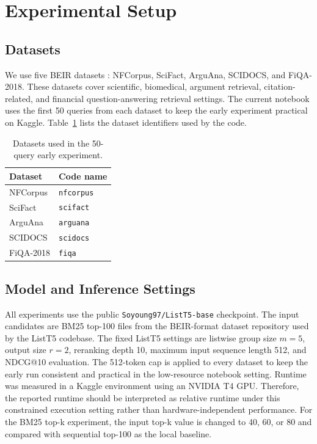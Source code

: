 \section{Experimental Setup}
\label{sec:experimental-setup}

\subsection{Datasets}

We use five BEIR datasets \citep{thakur2021beir}: NFCorpus, SciFact, ArguAna, SCIDOCS, and FiQA-2018.
These datasets cover scientific, biomedical, argument retrieval, citation-related, and financial question-answering retrieval settings.
The current notebook uses the first 50 queries from each dataset to keep the early experiment practical on Kaggle.
Table~\ref{tab:datasets} lists the dataset identifiers used by the code.

\begin{table}[t]
  \centering
  \begin{tabular}{ll}
    \toprule
    Dataset & Code name \\
    \midrule
    NFCorpus & \texttt{nfcorpus} \\
    SciFact & \texttt{scifact} \\
    ArguAna & \texttt{arguana} \\
    SCIDOCS & \texttt{scidocs} \\
    FiQA-2018 & \texttt{fiqa} \\
    \bottomrule
  \end{tabular}
  \caption{Datasets used in the 50-query early experiment.}
  \label{tab:datasets}
\end{table}

\subsection{Model and Inference Settings}

All experiments use the public \texttt{Soyoung97/ListT5-base} checkpoint.
The input candidates are BM25 top-100 files from the BEIR-format dataset repository used by the ListT5 codebase.
The fixed ListT5 settings are listwise group size $m=5$, output size $r=2$, reranking depth 10, maximum input sequence length 512, and NDCG@10 evaluation.
The 512-token cap is applied to every dataset to keep the early run consistent and practical in the low-resource notebook setting. Runtime was measured in a Kaggle environment using an NVIDIA T4 GPU. Therefore, the reported runtime should be interpreted as relative runtime under this constrained execution setting rather than hardware-independent performance.
For the BM25 top-k experiment, the input top-k value is changed to 40, 60, or 80 and compared with sequential top-100 as the local baseline.

